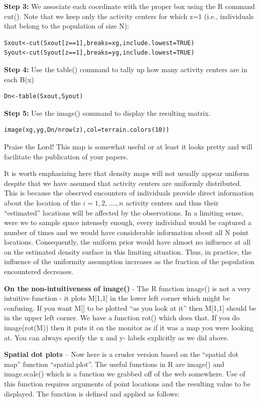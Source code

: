 {\flushleft \bf Step 3:} We associate each coordinate with the proper box using the R command cut(). Note that we keep only the activity centers for which z=1 (i.e., individuals that belong to the population of size N):
\begin{verbatim}
Sxout<-cut(Sxout[z==1],breaks=xg,include.lowest=TRUE)
Syout<-cut(Syout[z==1],breaks=yg,include.lowest=TRUE)
\end{verbatim}

{\flushleft \bf Step 4:} Use the table() command  to tally up how many activity centers are in each B(x) 
\begin{verbatim}
Dn<-table(Sxout,Syout)
\end{verbatim}

{\flushleft \bf Step 5:} Use the image() command to display the resulting matrix.
\begin{verbatim}
image(xg,yg,Dn/nrow(z),col=terrain.colors(10))
\end{verbatim}
Praise the Lord! This map is somewhat useful or at least it looks pretty and will facilitate the publication of your papers.

It is worth emphasizing here that density maps will not usually appear
uniform despite that we have assumed that activity centers are
uniformly distributed. This is because the observed encounters of
individuals provide direct information about the location of the
$i=1,2,....,n$ activity centers and thus their ``estimated'' locations
will be affected by the observations. In a limiting sense, were we to
sample space intensely enough, every individual would be captured a
number of times and we would have considerable information about all N
point locations. Consequently, the uniform prior would have almost no
influence at all on the estimated density surface in this limiting
situation. Thus, in practice, the influence of the uniformity
assumption increases as the fraction of the population encountered
decreases.

{\bf On the non-intuitiveness of image() }- The R function image() is not a very intuitive function - it plots M[1,1] in the lower left corner which might be confusing. If you want M[] to be plotted ``as you look at it'' then M[1,1] should be in the upper left corner.  We have a function rot() which does that. If you do image(rot(M)) then it puts it on the monitor as if it was a map you were looking at.  You can always specify the x and y- labels explicitly as we did above.

{\bf Spatial dot plots }-- Now here is a cruder version based on the
``spatial dot map'' function ``spatial.plot''.  The useful functions in R
are image() and image.scale() which is a function we grabbed off of
the web somewhere. Use of this function requires arguments of point
locations and the resulting value to be displayed. The function is
defined and applied as follows:

